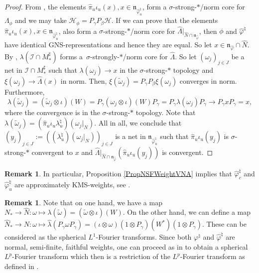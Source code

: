 \documentclass[11pt]{article}
\numberwithin{equation}{section}
\theoremstyle{definition}
\newtheorem{rmk}[thm]{Remark}
\newcommand{\cHil}{\mathcal{H}}
\begin{document}
\begin{proof}
 From \cite[Proposition 1.32]{KusVae}, the elements $\hat{\pi}_{u}  \iota_u(x), x \in \mathfrak{n}_{\hat{\varphi}_{u}^\natural}$, form a $\sigma$-strong-$\ast$/norm core for~$\Lambda_\phi$ and we may take $\cHil_\phi = P_\gamma P_\beta  \cHil$. If we can prove that    the elements $\hat{\pi}_{u}  \iota_u(x), x \in \mathfrak{n}_{\hat{\varphi}_{u}^\natural}$, also form a $\sigma$-strong-$\ast$/norm core for $\hat{\Lambda}\vert_{\hat{N} \cap \mathfrak{n}_{\hat{\varphi}}}$, then $\phi$ and $\hat{\varphi}^\natural$ have identical GNS-representations and hence they are equal. So let $x \in \mathfrak{n}_{\hat{\varphi}} \cap \hat{N}$. By \cite[Proposition~2.6]{KusVaeII}, $\lambda(\mathcal{I} \cap M_\ast^\sharp)$  forms a~$\sigma$-strongly-$\ast$/norm core for $\hat{\Lambda}$. So let $(\omega_j)_{j \in J}$ be a net in $\mathcal{I} \cap M_\ast^\sharp$  such that $\lambda(\omega_j) \rightarrow x$ in the $\sigma$-strong-$\ast$ topology and $\xi(\omega_j) \rightarrow \hat{\Lambda}(x)$ in norm. Then, $\xi(\tilde{\omega}_j) = P_\gamma P_\beta \xi(\omega_j)$ converges in norm. Furthermore,
\[
\lambda(\tilde{\omega}_j) = (\tilde{\omega}_j \otimes \iota)(W) = P_\gamma (\omega_j \otimes \iota)(W) P_\gamma = P_\gamma \lambda(\omega_j) P_\gamma \rightarrow P_\gamma x P_\gamma = x,
\]
where the convergence is in the $\sigma$-strong-$\ast$ topology. Note that $\lambda(\tilde{\omega}_j) = (\hat{\pi}_u \iota_u \lambda_u^\natural)(\omega_j\vert_N)$. All in all, we conclude that $(y_j)_{j \in J} := ((\lambda_u^\natural)(\omega_j\vert_N))_{j \in J}$ is a net in $ \mathfrak{n}_{\hat{\varphi}_{u}^\natural}$ such that $\hat{\pi}_{u}  \iota_u(y_j)$ is $\sigma$-strong-$\ast$ convergent to $x$ and $\hat{\Lambda}\vert_{\hat{N} \cap \mathfrak{n}_{\hat{\varphi}}}(\hat{\pi}_{u}  \iota_u(y_j))$ is convergent.
\end{proof}

\begin{rmk}
In particular, Proposition \ref{PropNSFWeightVNA} implies that $\hat{\varphi}_{c}^\natural$ and $\hat{\varphi}_{u}^\natural$ are approximately KMS-weights, see \cite[Proposition 1.35]{KusVae}.
\end{rmk}

\begin{rmk}
Note that on one hand, we have a map $N_\ast \rightarrow \hat{N}: \omega \mapsto \lambda(\tilde{\omega}) = (\tilde{\omega} \otimes \iota)(W)$. On the other hand, we can def\/ine a map $\hat{N}_\ast \rightarrow N: \omega \mapsto \hat{\lambda}(P_\gamma \omega P_\gamma) = (\iota \otimes \omega)(1\otimes P_\gamma)(W^\ast)(1\otimes P_\gamma)$. These can be considered as the spherical $L^1$-Fourier transforms. Since both $\varphi^\natural$ and $\hat{\varphi}^\natural$ are normal, semi-f\/inite, faithful weights, one can proceed as in \cite{Cas} to obtain a spherical $L^p$-Fourier transform which then is a restriction of the $L^p$-Fourier transform as def\/ined in \cite[Theorem 5.6]{Cas}.
\end{rmk}
\end{document}

